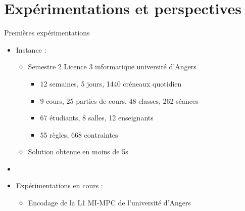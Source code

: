 \documentclass{beamer}
\begin{document}
\section{Expérimentations et perspectives}
\begin{frame}{Premières expérimentations}
    \begin{itemize}
        \item Instance :
        \begin{itemize}
            \item Semestre 2 Licence 3 informatique université d'Angers
            \begin{itemize}
                \item 12 semaines, 5 jours, 1440 créneaux quotidien
                \item 9 cours, 25 parties de cours, 48 classes, 262 séances
                \item  67 étudiants, 8 salles, 12 enseignants
                \item 55 règles, 668 contraintes
            \end{itemize} 
            
            \item Solution obtenue en moins de 5s
        \end{itemize}
        \item[]
         \item Expérimentations en cours :
        \begin{itemize}
            \item Encodage de la L1 MI-MPC de l'université d'Angers
        \end{itemize}
    \end{itemize}
\end{frame}
\end{document}
